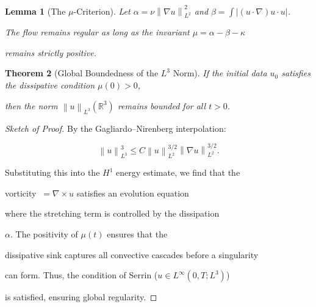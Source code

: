 ﻿\documentclass[11pt,a4paper]{amsart}
\newtheorem{theorem}{Theorem}[section]
\newtheorem{lemma}[theorem]{Lemma}
\newcommand{\alphacoeff}{\ensuremath{\alpha}}
\newcommand{\betacoeff}{\ensuremath{\beta}}
\newcommand{\kappacoeff}{\ensuremath{\kappa}}
\newcommand{\mumargin}{\ensuremath{\mu}}
\newcommand{\norm}[1]{\left\|#1\right\|}
\begin{document}
\begin{lemma}[The $\mumargin$-Criterion]

Let $\alphacoeff = \nu \norm{\nabla u}_{L^2}^2$ and $\betacoeff = \int |(u \cdot \nabla)u \cdot u|$.

The flow remains regular as long as the invariant $\mumargin = \alphacoeff - \betacoeff - \kappacoeff$

remains strictly positive.

\end{lemma}



\begin{theorem}[Global Boundedness of the $L^3$ Norm]

If the initial data $u_0$ satisfies the dissipative condition $\mumargin(0) > 0$,

then the norm $\norm{u}_{L^3}(\mathbb{R}^3)$ remains bounded for all $t > 0$.

\end{theorem}



\begin{proof}[Sketch of Proof]

By the Gagliardo--Nirenberg interpolation:

\begin{equation}

 \norm{u}_{L^3}^3 \le C \norm{u}_{L^2}^{3/2} \norm{\nabla u}_{L^2}^{3/2}.

\end{equation}

Substituting this into the $H^1$ energy estimate, we find that the

vorticity $\ = \nabla \times u$ satisfies an evolution equation

where the stretching term is controlled by the dissipation

$\alphacoeff$. The positivity of $\mumargin(t)$ ensures that the

dissipative sink captures all convective cascades before a singularity

can form. Thus, the condition of Serrin ($u \in L^{\infty}(0, T; L^3)$)

is satisfied, ensuring global regularity.

\end{proof}



\end{document}
